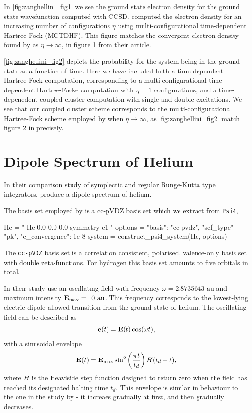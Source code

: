 In \autoref{fig:zanghellini_fig1} we see the ground state electron density for the 
ground state wavefunction computed with CCSD. \citeauthor{Zanghellini04} computed the electron
density for an increasing number of configurations $\eta$ using multi-configurational
time-dependent Hartree-Fock (MCTDHF). This figure matches the convergent electron density found by
\citeauthor{Zanghellini04} as $\eta \to \infty$, in figure 1 from their article. 

\autoref{fig:zanghellini_fig2} depicts the probability for the system being in the ground 
state as a function of time. Here we have included both a time-dependent Hartree-Fock
computation, corresponding to a multi-configurational time-dependent 
Hartree-Focke computation with $\eta=1$ configurations, and 
a time-depenedent coupled cluster computation with single and double excitations.
We see that our coupled cluster scheme corresponds to the multi-configurational Hartree-Fock 
scheme employed by \citeauthor{Zanghellini04} when $\eta\to\infty$, as
\autoref{fig:zanghellini_fig2} match figure 2 in
\citeauthor{Zanghellini04}\cite{Zanghellini04} precisely.


\section{Dipole Spectrum of Helium}

In their comparison study of symplectic and regular Runge-Kutta type integrators, 
\citeauthor{pedersen2019symplectic}\cite{pedersen2019symplectic} produce a dipole 
spectrum of helium. 

The basis set employed by \citeauthor{pedersen2019symplectic} is a cc-pVDZ 
basis set which we extract from \lstinline{Psi4},
\begin{python}
He = "
    He 0.0 0.0 0.0
    symmetry c1
"
options = {"basis": "cc-pvdz", "scf_type": "pk", "e_convergence": 1e-8}
system = construct_psi4_system(He, options)
\end{python}
The \lstinline{cc-pVDZ} basis set is a correlation consistent, polarised, valence-only 
basis set with double zeta-functions. For hydrogen this basis set amounts to five 
orbitals in total.

In their study \citeauthor{pedersen2019symplectic} use an oscillating field with 
frequency $\omega=2.8735643 \text{ au}$ and maximum intensity
$\vb{E}_\text{max} = 10 \text{ au}$. This frequency corresponds to the lowest-lying 
electric-dipole allowed transition from the ground state of helium. The oscillating 
field can be described as 
\begin{equation}
    \vb{e}(t) = \vb{E}(t) \cos(\omega t),
\end{equation}
with a sinusoidal envelope
\begin{equation}
    \label{eq:pedersen_2019_envelope}
    \vb{E}(t) = \vb{E}_\text{max}\sin^2\left(\frac{\pi t}{t_d}\right) H(t_d - t),
\end{equation}
where $H$ is the Heaviside step function designed to return zero when the field 
has reached its designated halting time $t_d$. This envelope is similar in behaviour 
to the one in the study by \citeauthor{li2005time}\cite{li2005time} - it 
increaes gradually at first, and then gradually decreases. 

